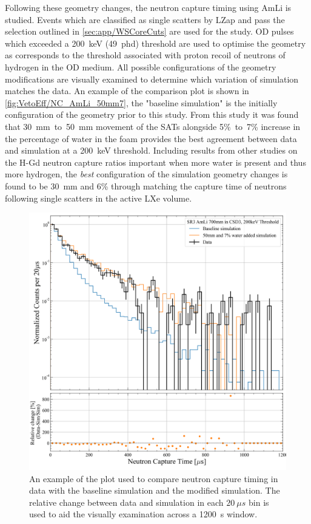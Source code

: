 Following these geometry changes, the neutron capture timing using AmLi is studied. Events which are classified as single scatters by LZap and pass the selection outlined in \autoref{sec:app/WSCoreCuts} are used for the study. OD pulses which exceeded a 200~keV (49~phd) threshold are used to optimise the geometry as corresponds to the threshold associated with proton recoil of neutrons of hydrogen in the OD medium.
All possible configurations of the geometry modifications are visually examined to determine which variation of simulation matches the data. An example of the comparison plot is shown in \autoref{fig:VetoEff/NC_AmLi_50mm7}, the "baseline simulation" is the initially configuration of the geometry prior to this study. %
From this study it was found that 30~mm~to~50~mm movement of the SATs alongside 5\%~to~7\% increase in the percentage of water in the foam provides the best agreement between data and simulation at a 200~keV threshold. Including results from other studies on the H-Gd neutron capture ratios important when more water is present and thus more hydrogen, the \textit{best} configuration of the simulation geometry changes is found to be 30~mm and 6\% through matching the capture time of neutrons following single scatters in the active LXe volume.
\begin{figure}[!ht]
	\centering
	\includegraphics[width=0.9\linewidth]{figures/VetoEfficiency/movedSAT50mm_7percentWater_AmLi_CSD3_Z700mm_200keV_Ratio.png}
	\caption[An example of the plot used to compare neutron capture timing in data with the baseline simulation and the modified simulation.]{An example of the plot used to compare neutron capture timing in data with the baseline simulation and the modified simulation. The relative change between data and simulation in each $20~\mu s$ bin is used to aid the visually examination across a 1200~\textmu s window.}
	\label{fig:VetoEff/NC_AmLi_50mm7}
\end{figure}


